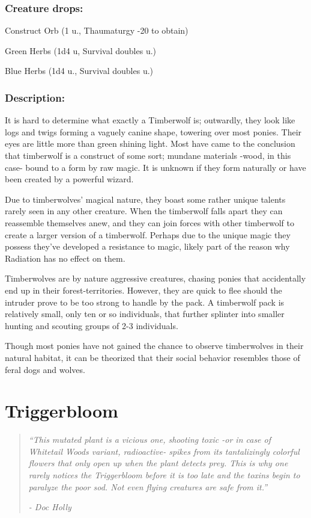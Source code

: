 \documentclass[11pt,a4paper,twocolumn]{book}
\begin{document}
	\subsubsection*{Creature drops:}
	\begin{compactitem}
		\item Construct Orb (1 u., Thaumaturgy -20 to obtain)
		\item Green Herbs (1d4 u, Survival doubles u.)
		\item Blue Herbs (1d4 u., Survival doubles u.)
	\end{compactitem}
	
	\subsubsection*{Description:}
	It is hard to determine what exactly a Timberwolf is; outwardly, they look like logs and twigs forming a vaguely canine shape, towering over most ponies. Their eyes are little more than green shining light. Most have came to the conclusion that timberwolf is a construct of some sort; mundane materials -wood, in this case- bound to a form by raw magic. It is unknown if they form naturally or have been created by a powerful wizard.
	
	Due to timberwolves' magical nature, they boast some rather unique talents rarely seen in any other creature. When the timberwolf falls apart they can reassemble themselves anew, and they can join forces with other timberwolf to create a larger version of a timberwolf. Perhaps due to the unique magic they possess they've developed a resistance to magic, likely part of the reason why Radiation has no effect on them.
	
	Timberwolves are by nature aggressive creatures, chasing ponies that accidentally end up in their forest-territories. However, they are quick to flee should the intruder prove to be too strong to handle by the pack. 
	A timberwolf pack is relatively small, only ten or so individuals, that further splinter into smaller hunting and scouting groups of 2-3 individuals.
	
	Though most ponies have not gained the chance to observe timberwolves in their natural habitat, it can be theorized that their social behavior resembles those of feral dogs and wolves.
	
	\clearpage
	
	\section*{Triggerbloom}
	\begin{quote}
		\emph{``This mutated plant is a vicious one, shooting toxic -or in case of Whitetail Woods variant, radioactive- spikes from its tantalizingly colorful flowers that only open up when the plant detects prey. This is why one rarely notices the Triggerbloom before it is too late and the toxins begin to paralyze the poor sod. Not even flying creatures are safe from it.''}
		
		\emph{-	Doc Holly}
	\end{quote}
	
\end{document}
